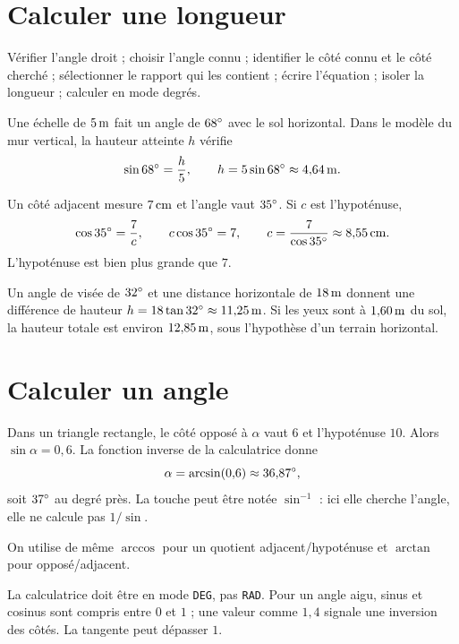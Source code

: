 \documentclass[../cours_3e.tex]{subfiles}
\begin{document}
\section{Calculer une longueur}
\begin{methode}
Vérifier l'angle droit ; choisir l'angle connu ; identifier le côté connu et le côté cherché ; sélectionner le rapport qui les contient ; écrire l'équation ; isoler la longueur ; calculer en mode degrés.
\end{methode}
\begin{exemple}
Une échelle de $5\,\mathrm{m}$ fait un angle de $68^{\circ}$ avec le sol horizontal. Dans le modèle du mur vertical, la hauteur atteinte $h$ vérifie
\[\sin68^{\circ}=\frac h5,\qquad h=5\sin68^{\circ}\approx4{,}64\,\mathrm{m}.\]
\end{exemple}
\begin{exemple}
Un côté adjacent mesure $7\,\mathrm{cm}$ et l'angle vaut $35^{\circ}$. Si $c$ est l'hypoténuse,
\[\cos35^{\circ}=\frac7c,\qquad c\cos35^{\circ}=7,\qquad
c=\frac7{\cos35^{\circ}}\approx8{,}55\,\mathrm{cm}.\]
L'hypoténuse est bien plus grande que $7$.
\end{exemple}
\begin{exemple}
Un angle de visée de $32^{\circ}$ et une distance horizontale de $18\,\mathrm{m}$ donnent une différence de hauteur $h=18\tan32^{\circ}\approx11{,}25\,\mathrm{m}$. Si les yeux sont à $1{,}60\,\mathrm{m}$ du sol, la hauteur totale est environ $12{,}85\,\mathrm{m}$, sous l'hypothèse d'un terrain horizontal.
\end{exemple}
\section{Calculer un angle}
\begin{exemple}
Dans un triangle rectangle, le côté opposé à $\alpha$ vaut $6$ et l'hypoténuse $10$. Alors $\sin\alpha=0{,}6$.
La fonction inverse de la calculatrice donne
\[\alpha=\arcsin(0{,}6)\approx36{,}87^{\circ},\]
soit $37^{\circ}$ au degré près. La touche peut être notée $\sin^{-1}$ : ici elle cherche l'angle, elle ne calcule pas $1/\sin$.
\end{exemple}
On utilise de même $\arccos$ pour un quotient adjacent/hypoténuse et $\arctan$ pour opposé/adjacent.
\begin{attention}
La calculatrice doit être en mode \texttt{DEG}, pas \texttt{RAD}. Pour un angle aigu, sinus et cosinus sont compris entre $0$ et $1$ ; une valeur comme $1{,}4$ signale une inversion des côtés. La tangente peut dépasser $1$.
\end{attention}
\end{document}
